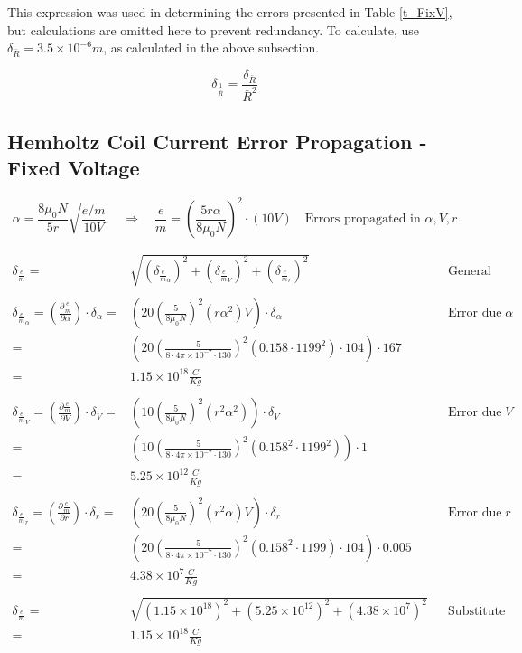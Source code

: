 \documentclass[12pt]{article}
\newcommand{\paren}[1]{\left( {#1} \right)}
\begin{document}
This expression was used in determining the errors presented in Table \ref{t_FixV}, but calculations are omitted here to prevent redundancy. To calculate, use $\delta_{\bar{R}}=3.5\times10^{-6} m$, as calculated in the above subsection.

\begin{equation}
	\delta_{\frac{1}{\bar{R}}}=\frac{\delta_{\bar{R}}}{\bar{R}^2}
	\label{R_bar_inverse_err}
\end{equation}

\clearpage

\subsection{Hemholtz Coil Current Error Propagation - Fixed Voltage} \label{sec:FixedVoltageErr}

\begin{equation}
	\alpha = \frac{8\mu_0N}{5r}\sqrt{\frac{e/m}{10V}}\
	\quad \Rightarrow \quad
	\frac{e}{m}=\paren{\frac{5r\alpha}{8\mu_0N}}^2\cdot(10V)
	\quad \text{Errors propagated in }\alpha, V, r 
	\label{em_derive_FixV}
\end{equation}

\begin{align*}
	\delta_\frac{e}{m}=&\sqrt{\paren{\delta_{\frac{e}{m}_\alpha}}^2+\paren{\delta_{\frac{e}{m}_V}}^2+\paren{\delta_{\frac{e}{m}_r}}^2} && \text{General Error Equation} \\ \\
	\delta_{\frac{e}{m}_\alpha} = \paren{\frac{\partial \frac{e}{m}}{\partial \alpha}}\cdot\delta_\alpha =& \paren{20\paren{\frac{5}{8\mu_0N}}^2(r\alpha^2)V}\cdot\delta_\alpha && \text{Error due to }\alpha \\
	=& \paren{20\paren{\frac{5}{8\cdot4\pi\times10^{-7}\cdot130}}^2(0.158\cdot1199^2)\cdot104}\cdot167 \\
	=& 1.15\times10^{18} \frac{C}{Kg} \\ \\
	\delta_{\frac{e}{m}_V} = \paren{\frac{\partial \frac{e}{m}}{\partial V}}\cdot\delta_V =& \paren{10\paren{\frac{5}{8\mu_0N}}^2(r^2\alpha^2)}\cdot \delta_V && \text{Error due to }V \\
	=& \paren{10\paren{\frac{5}{8\cdot4\pi\times10^{-7}\cdot130}}^2(0.158^2\cdot1199^2)}\cdot1 \\
	=& 5.25\times10^{12} \frac{C}{Kg} \\ \\
	\delta_{\frac{e}{m}_r} = \paren{\frac{\partial \frac{e}{m}}{\partial r}}\cdot\delta_r =& \paren{20\paren{\frac{5}{8\mu_0N}}^2(r^2\alpha)V}\cdot \delta_r && \text{Error due to }r \\
	=& \paren{20\paren{\frac{5}{8\cdot4\pi\times10^{-7}\cdot130}}^2(0.158^2\cdot1199)\cdot104}\cdot0.005 \\
	=& 4.38\times10^7 \frac{C}{Kg} \\ \\
	\delta_\frac{e}{m} =& \sqrt{(1.15\times10^{18})^2+(5.25\times10^{12})^2+(4.38\times10^7)^2} && \text{Substitute Values}\\
	=& 1.15\times10^{18} \frac{C}{Kg}
\end{align*}
\end{document}
